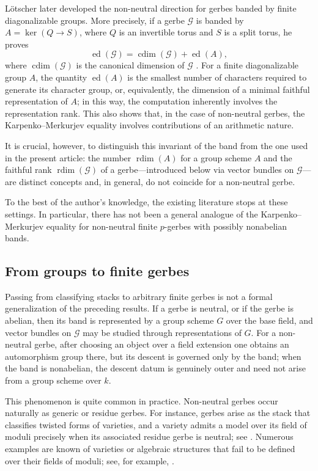 \documentclass[11pt,reqno]{amsart}
\numberwithin{equation}{section}
\theoremstyle{plain}
\theoremstyle{definition}
\def\cG{{\mathcal G}}
\def\rdim{{\operatorname{rdim}}}
\def\ed{{\operatorname{ed}}}
\def\cdim{{\operatorname{cdim}}}
\begin{document}
L\"otscher later developed the non-neutral direction for gerbes
banded by finite diagonalizable groups. More precisely, if a gerbe
$\cG$ is banded by $A=\ker(Q\to S)$, where $Q$ is an invertible torus and
$S$ is a split torus, he proves
\[
\ed(\cG)=\cdim(\cG)+\ed(A),
\]
where $\cdim(\cG)$ is the canonical dimension of $\cG$ \cite[Theorem~1.1]{LotscherGerbes}. For a finite diagonalizable group $A$, the quantity $\ed(A)$ is the smallest number of characters required to generate its character group, or, equivalently, the dimension of a minimal faithful representation of $A$; in this way, the computation inherently involves the representation rank. This also shows that, in the case of non-neutral gerbes, the Karpenko–Merkurjev equality involves contributions of an arithmetic nature.

It is crucial, however, to distinguish this invariant of the band from the one used in the present article: the number $\rdim(A)$ for a group scheme $A$ and the faithful rank $\rdim(\cG)$ of a gerbe—introduced below via vector bundles on $\cG$—are distinct concepts and, in general, do not coincide for a non-neutral gerbe.

To the best of the author's knowledge, the existing literature stops at
these settings.  In particular, there has not been a general analogue of
the Karpenko--Merkurjev equality for non-neutral finite $p$-gerbes with
possibly nonabelian bands.

\subsection{From groups to finite gerbes}

Passing from classifying stacks to arbitrary finite gerbes is not a formal generalization of the preceding results. If a gerbe is neutral, or if the gerbe is abelian, then its band is represented by a group scheme $G$ over the base field, and vector bundles on $\cG$ may be studied through representations of $G$. For a non-neutral gerbe, after choosing an object over a field extension one obtains an automorphism group there, but its descent is governed only by the band; when the band is nonabelian, the descent datum is genuinely outer and need not arise from a group scheme over $k$.

This phenomenon is quite common in practice. Non-neutral gerbes occur naturally as generic or residue gerbes. For instance, gerbes arise as the stack that classifies twisted forms of varieties, and a variety admits a model over its field of moduli precisely when its associated residue gerbe is neutral; see \cite{Bresciani_Vistoli_2024}. Numerous examples are known of varieties or algebraic structures that fail to be defined over their fields of moduli; see, for example, \cite{bresciani-plane,Bresciani-Divisor,yang2026fieldsmodulismoothdel}.
\end{document}
